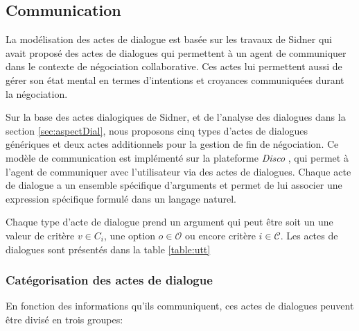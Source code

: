 \subsection{Communication}
\label{sec:communication}


La modélisation des actes de dialogue est basée sur les travaux de Sidner \cite{sidner1994artificial} qui avait proposé des actes de dialogues qui permettent à un agent de communiquer dans le contexte de négociation collaborative. Ces actes lui permettent aussi de gérer son état mental en termes d'intentions et croyances communiquées durant la négociation. 

Sur la base des actes dialogiques de Sidner, et de l'analyse des dialogues dans la section \ref{sec:aspectDial}, nous proposons cinq types d'actes de dialogues génériques et deux actes additionnels pour la gestion de fin de négociation. 
Ce modèle de communication est implémenté sur la plateforme \emph{Disco} \cite{rich09}, qui permet à l'agent de communiquer avec l'utilisateur via des actes de dialogues. Chaque acte de dialogue a un ensemble spécifique d'arguments et permet de lui associer une expression spécifique formulé dans un langage naturel.

Chaque type d'acte de dialogue prend un argument qui peut être soit un une valeur de critère  $v \in C_i$, une option $o \in \mathcal{O}$ ou encore critère $i \in \mathcal{C}$. 
Les actes de dialogues sont présentés dans la table \ref{table:utt}

\subsubsection{Catégorisation des actes de dialogue}

En fonction des informations qu'ils communiquent, ces actes de dialogues peuvent être divisé en trois groupes:

